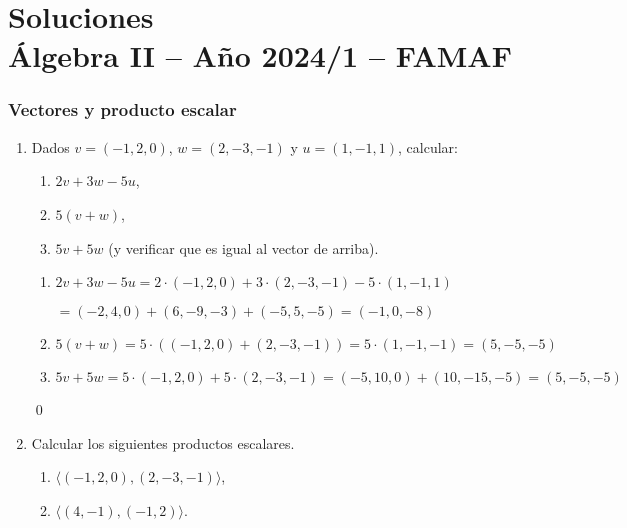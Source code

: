 \chapter{Soluciones\\Álgebra  II -- Año 2024/1 -- FAMAF}\label{practico-1}
    


\subsection*{Vectores y producto escalar}

\begin{enumerate}[topsep=6pt, itemsep=.4cm]


    \item Dados $v = (-1, 2, 0)$, $w = (2,-3,-1)$ y $u = (1,-1,1)$, calcular:
    \begin{enumerate}
        \item $2v + 3w -5u$,
        \item $5(v+w)$,
        \item $5v + 5w$ (y verificar que es igual al vector de arriba).
    \end{enumerate}

\rta

\begin{enumerate}
	\item $2v + 3w -5u = 2 \cdot (-1, 2, 0) + 3 \cdot (2,-3,-1) - 5 \cdot (1,-1,1) $

$ = (-2, 4, 0) + (6,-9,-3) + (-5,5,-5) = \boxed{(-1,0,-8)}$
	\item $5(v+w) = 5 \cdot ( (-1, 2, 0) + (2,-3,-1) ) = 5 \cdot (1,-1,-1) = \boxed{(5,-5,-5)} $
	\item $5v + 5w = 5 \cdot (-1, 2, 0) + 5 \cdot (2,-3,-1) = (-5, 10, 0) + (10,-15,-5) = \boxed{(5,-5,-5)}$
\end{enumerate}

\qed


\item Calcular los siguientes productos escalares. %
\begin{enumerate}
  \item $\langle (-1, 2, 0) ,(2,-3,-1) \rangle$,
  \item  $\langle (4,-1),(-1,2) \rangle$.
\end{enumerate}


\end{enumerate}
